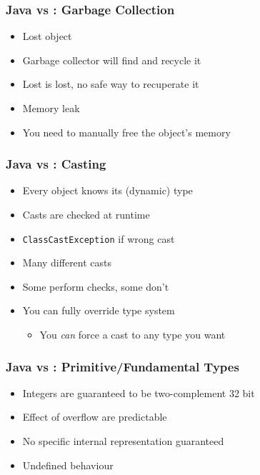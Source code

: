 \begin{frame}
  \frametitle{Java vs \cpp: Garbage Collection}
  \begin{itemize}
    \item Lost object
    \item Garbage collector will find and recycle it
  \end{itemize}
  \vskip2mm
  \structure{\cpp}
  \begin{itemize}
    \item Lost is lost, no safe way to recuperate it
    \item Memory leak
    \item You need to manually free the object's memory
  \end{itemize}
\end{frame}

\begin{frame}
  \frametitle{Java vs \cpp: Casting}
  \begin{itemize}
    \item Every object knows its (dynamic) type
    \item Casts are checked at runtime
    \item \texttt{ClassCastException} if wrong cast
  \end{itemize}
  \vskip2mm
  \structure{\cpp}
  \begin{itemize}
    \item Many different casts
    \item Some perform checks, some don't
    \item You can fully override type system
          \begin{itemize}
            \item You \emph{can} force a cast to any type you want
          \end{itemize}
  \end{itemize}
\end{frame}

\begin{frame}
  \frametitle{Java vs \cpp: Primitive/Fundamental Types}
  \begin{itemize}
    \item Integers are guaranteed to be two-complement 32 bit
    \item Effect of overflow are predictable
  \end{itemize}
  \vskip2mm
  \structure{\cpp}
  \begin{itemize}
    \item No specific internal representation guaranteed 
    \item Undefined behaviour
  \end{itemize}
\end{frame}

